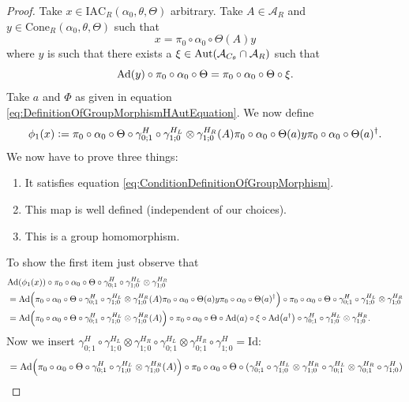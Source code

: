 \documentclass[12pt,a4paper,twoside]{article}
\newcommand{\IAC}{\textrm{IAC}}
\newcommand{\defeq}{\vcentcolon=}
\let\originalleft\left
\let\originalright\right
\renewcommand{\left}{\mathopen{}\mathclose\bgroup\originalleft}
\renewcommand{\right}{\aftergroup\egroup\originalright}
\renewcommand{\AA}{\mathcal A}
\newcommand{\Ad}[1]{\textrm{Ad}\left(#1\right)}
\newcommand{\Aut}[1]{\textrm{Aut}\left(#1\right)}
\theoremstyle{definition}
\numberwithin{equation}{section}
\begin{document}
\begin{proof}
	Take $x\in \IAC_R(\alpha_0,\theta,\Theta)$ arbitrary. Take $A\in\AA_R$ and $y\in\textrm{Cone}_R(\alpha_0,\theta,\Theta)$ such that
	\begin{equation}
	x=\pi_0\circ\alpha_0\circ\Theta(A)y
	\end{equation}
	where $y$ is such that there exists a $\xi\in\Aut{\AA_{C_\theta}\cap \AA_R}$ such that
	\begin{equation}
	\Ad{y}\circ\pi_0\circ\alpha_0\circ\Theta=\pi_0\circ\alpha_0\circ\Theta\circ\xi.
	\end{equation}
	Take $a$ and $\Phi$ as given in equation \eqref{eq:DefinitionOfGroupMorphismHAutEquation}. We now define
	\begin{equation}
		\phi_1(x)\defeq \pi_0\circ\alpha_0\circ\Theta\circ\gamma^H_{0;1}\circ\gamma^{H_L}_{1;0}\otimes\gamma^{H_R}_{1;0}(A)\pi_0\circ\alpha_0\circ\Theta(a)y\pi_0\circ\alpha_0\circ\Theta(a)^\dagger.
	\end{equation}
	We now have to prove three things:
	\begin{enumerate}
		\item It satisfies equation \eqref{eq:ConditionDefinitionOfGroupMorphism}.
		\item This map is well defined (independent of our choices).
		\item This is a group homomorphism.
	\end{enumerate}
	To show the first item just observe that
	\begin{align}
		&\Ad{\phi_1(x)}\circ\pi_0\circ\alpha_0\circ\Theta\circ\gamma^H_{0;1}\circ\gamma^{H_L}_{1;0}\otimes\gamma^{H_R}_{1;0}\\
		&=\Ad{\pi_0\circ\alpha_0\circ\Theta\circ\gamma^H_{0;1}\circ\gamma^{H_L}_{1;0}\otimes\gamma^{H_R}_{1;0}(A)\pi_0\circ\alpha_0\circ\Theta(a)y\pi_0\circ\alpha_0\circ\Theta(a)^\dagger}\circ\pi_0\circ\alpha_0\circ\Theta\circ\gamma^H_{0;1}\circ\gamma^{H_L}_{1;0}\otimes\gamma^{H_R}_{1;0}\\
		&=\Ad{\pi_0\circ\alpha_0\circ\Theta\circ\gamma^H_{0;1}\circ\gamma^{H_L}_{1;0}\otimes\gamma^{H_R}_{1;0}(A)}\circ\pi_0\circ\alpha_0\circ\Theta\circ\Ad{a}\circ\xi\circ\Ad{a^\dagger}\circ\gamma^H_{0;1}\circ\gamma^{H_L}_{1;0}\otimes\gamma^{H_R}_{1;0}.
	\end{align}
	Now we insert $\gamma^H_{0;1}\circ\gamma^{H_L}_{1;0}\otimes\gamma^{H_R}_{1;0}\circ\gamma^{H_L}_{0;1}\otimes\gamma^{H_R}_{0;1}\circ\gamma^H_{1;0}=\text{Id}:$
	\begin{align}
		&=\Ad{\pi_0\circ\alpha_0\circ\Theta\circ\gamma^H_{0;1}\circ\gamma^{H_L}_{1;0}\otimes\gamma^{H_R}_{1;0}(A)}\circ\pi_0\circ\alpha_0\circ\Theta\circ(\gamma^H_{0;1}\circ\gamma^{H_L}_{1;0}\otimes\gamma^{H_R}_{1;0}\circ\gamma^{H_L}_{0;1}\otimes\gamma^{H_R}_{0;1}\circ\gamma^H_{1;0})\\

\end{align}
\end{proof}
\end{document}
